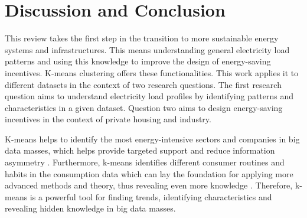 


\section{Discussion and Conclusion}
\label{cha:discussionAndConclusion}

This review takes the first step in the transition to more sustainable energy systems and infrastructures.
This means understanding general electricity load patterns and using this knowledge to improve the design of energy-saving incentives.
K-means clustering offers these functionalities.
This work applies it to different datasets in the context of two research questions.
The first research question aims to understand electricity load profiles by identifying patterns and characteristics in a given dataset.
Question two aims to design energy-saving incentives in the context of private housing and industry.

K-means helps to identify the most energy-intensive sectors and companies in big data masses, which helps provide targeted support and reduce information asymmetry \cite{LIU-BDE}.
Furthermore, k-means identifies different consumer routines and habits in the consumption data which can lay the foundation for applying more advanced methods and theory, thus revealing even more knowledge \cite{MAL-HBP}.
Therefore, k-means is a powerful tool for finding trends, identifying characteristics and revealing hidden knowledge in big data masses.

